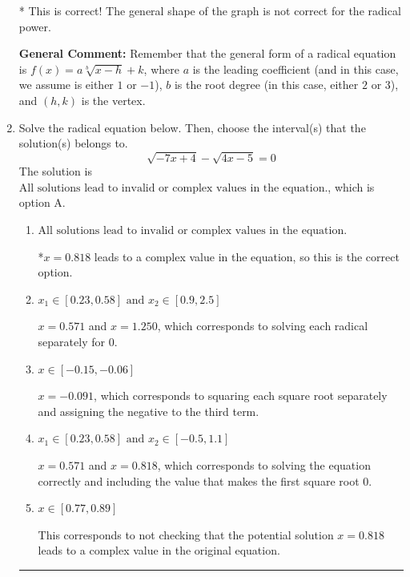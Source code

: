 \documentclass{extbook}[14pt]
\newcommand{\litem}[1]{\item #1

\rule{\textwidth}{0.4pt}}
\begin{document}
\begin{enumerate}
{\begin{enumerate}[label=\Alph*.]
* This is correct! The general shape of the graph is not correct for the radical power.
\end{enumerate}

\textbf{General Comment:} Remember that the general form of a radical equation is $ f(x) = a \sqrt[b]{x - h} + k$, where $a$ is the leading coefficient (and in this case, we assume is either $1$ or $-1$), $b$ is the root degree (in this case, either $2$ or $3$), and $(h, k)$ is the vertex.
}
\litem{
Solve the radical equation below. Then, choose the interval(s) that the solution(s) belongs to.
\[ \sqrt{-7 x + 4} - \sqrt{4 x - 5} = 0 \]The solution is \( \text{All solutions lead to invalid or complex values in the equation.} \), which is option A.\begin{enumerate}[label=\Alph*.]
\item \( \text{All solutions lead to invalid or complex values in the equation.} \)

*$x = 0.818$ leads to a complex value in the equation, so this is the correct option.
\item \( x_1 \in [0.23, 0.58] \text{ and } x_2 \in [0.9,2.5] \)

$x = 0.571$ and $x = 1.250$, which corresponds to solving each radical separately for 0.
\item \( x \in [-0.15,-0.06] \)

$x = -0.091$, which corresponds to squaring each square root separately and assigning the negative to the third term.
\item \( x_1 \in [0.23, 0.58] \text{ and } x_2 \in [-0.5,1.1] \)

$x = 0.571$ and $x = 0.818$, which corresponds to solving the equation correctly and including the value that makes the first square root 0.
\item \( x \in [0.77,0.89] \)

This corresponds to not checking that the potential solution $x = 0.818$ leads to a complex value in the original equation.
\end{enumerate}

}
\end{enumerate}
\end{document}
